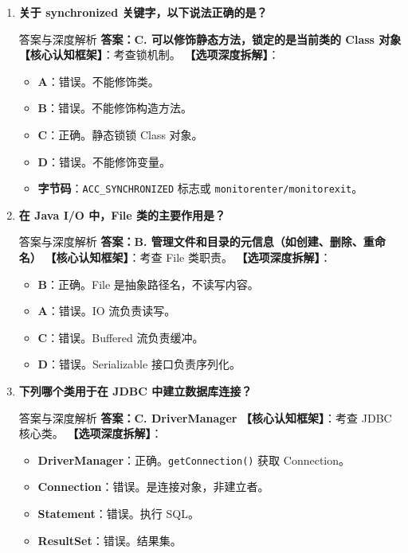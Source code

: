 \documentclass[12pt, a4paper]{ctexart}
\newcommand{\code}[1]{\texttt{\color{myblue}#1}}
\begin{document}
\begin{enumerate}[label=\arabic*.]
	\item \textbf{关于 synchronized 关键字，以下说法正确的是？}
	      \begin{bluebox}{答案与深度解析}
		      \textbf{答案：C. 可以修饰静态方法，锁定的是当前类的 Class 对象}
		      \textbf{【核心认知框架】}：考查锁机制。
		      \textbf{【选项深度拆解】}：
		      \begin{itemize}[leftmargin=*, nosep]
			      \item \textbf{A}：错误。不能修饰类。
			      \item \textbf{B}：错误。不能修饰构造方法。
			      \item \textbf{C}：正确。静态锁锁 Class 对象。
			      \item \textbf{D}：错误。不能修饰变量。
			      \item \textbf{字节码}：\code{ACC\_SYNCHRONIZED} 标志或 \code{monitorenter/monitorexit}。
		      \end{itemize}
	      \end{bluebox}

	\item \textbf{在 Java I/O 中，File 类的主要作用是？}
	      \begin{bluebox}{答案与深度解析}
		      \textbf{答案：B. 管理文件和目录的元信息（如创建、删除、重命名）}
		      \textbf{【核心认知框架】}：考查 File 类职责。
		      \textbf{【选项深度拆解】}：
		      \begin{itemize}[leftmargin=*, nosep]
			      \item \textbf{B}：正确。File 是抽象路径名，不读写内容。
			      \item \textbf{A}：错误。IO 流负责读写。
			      \item \textbf{C}：错误。Buffered 流负责缓冲。
			      \item \textbf{D}：错误。Serializable 接口负责序列化。
		      \end{itemize}
	      \end{bluebox}

	\item \textbf{下列哪个类用于在 JDBC 中建立数据库连接？}
	      \begin{bluebox}{答案与深度解析}
		      \textbf{答案：C. DriverManager}
		      \textbf{【核心认知框架】}：考查 JDBC 核心类。
		      \textbf{【选项深度拆解】}：
		      \begin{itemize}[leftmargin=*, nosep]
			      \item \textbf{DriverManager}：正确。\code{getConnection()} 获取 Connection。
			      \item \textbf{Connection}：错误。是连接对象，非建立者。
			      \item \textbf{Statement}：错误。执行 SQL。
			      \item \textbf{ResultSet}：错误。结果集。
		      \end{itemize}
	      \end{bluebox}


\end{enumerate}
\end{document}
